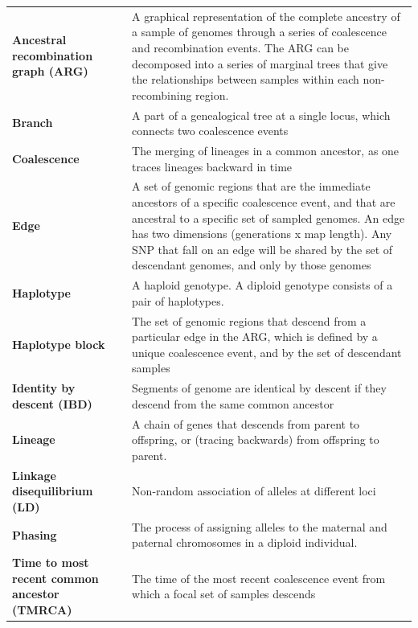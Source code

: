 \documentclass[twocolumn]{bmcart}%
\begin{document}
\begin{strip}
\begin{tcolorbox}[colback=blue!2!white,colframe=blue!60!black,title=Glossary,fontupper=\footnotesize\sffamily, before
skip=0pt,after skip=0pt]
\begin{tabular}{ m{4.2cm} m{10cm} } 
\textbf{Ancestral recombination graph (ARG)} & A graphical representation of the complete ancestry of a sample of genomes through a series of coalescence and recombination events. The ARG can be decomposed into a series of marginal trees that give the relationships between samples within each non-recombining region. \\
\textbf{Branch} & A part of a genealogical tree at a single locus, which connects two coalescence events \\
\textbf{Coalescence} & The merging of lineages in a common ancestor, as one traces lineages backward in time \\
\textbf{Edge} & A set of genomic regions that are the immediate ancestors of a specific coalescence event, and that are ancestral to a specific set of sampled genomes. An edge has two dimensions (generations x map length). Any SNP that fall on an edge will be shared by the set of descendant genomes, and only by those genomes \\
\textbf{Haplotype} & A haploid genotype. A diploid genotype consists of a pair of haplotypes. \\
\textbf{Haplotype block} & The set of genomic regions that descend from a particular edge in the ARG, which is defined by a unique coalescence event, and by the set of descendant samples \\
\textbf{Identity by descent (IBD)} & Segments of genome are identical by descent if they descend from the same common ancestor \\
\textbf{Lineage} & A chain of genes that descends from parent to offspring, or (tracing backwards) from offspring to parent. \\
\textbf{Linkage disequilibrium (LD)} & Non-random association of alleles at different loci \\
\textbf{Phasing} & The process of assigning alleles to the maternal and paternal chromosomes in a diploid individual. \\
\textbf{Time to most recent common ancestor (TMRCA)} & The time of the most recent coalescence event from which a focal set of samples descends
\end{tabular}\hfill
\end{tcolorbox}
\end{strip}
\end{document}
